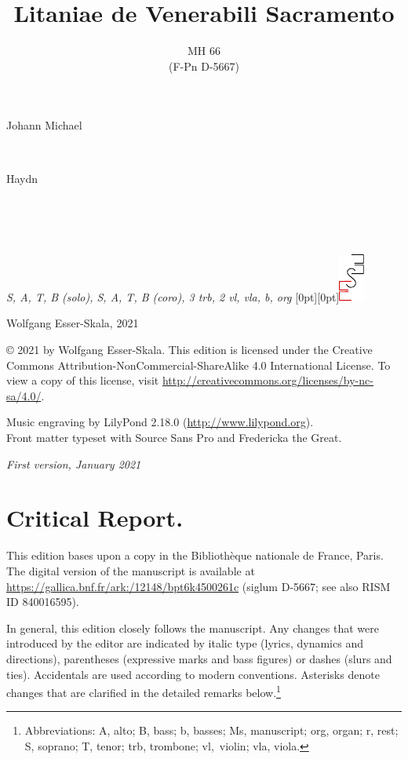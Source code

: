 \documentclass[parskip=full]{scrreprt}
\makeatletter
\DeclareRobustCommand{\sbseries}{\fontseries{sb}\selectfont}
\newcommand\fancytitlehead{
	\headingfont%
	\fontsize{80}{80}\selectfont\textcolor{black!80}{\@ifundefined{@shortname}{\@lastname}{\@shortname}.}\\[15pt]%
	\fontsize{60}{60}\selectfont\@ifundefined{@shorttitle}{\@title}{\@shorttitle}.%
}
\def\firstname#1{\def\@firstname{#1}}
\def\lastname#1{\def\@lastname{#1}}
\def\shortname#1{\def\@shortname{#1}}
\def\shorttitle#1{\def\@shorttitle{#1}}
\def\instrumentation#1{\def\@instrumentation{#1}}
\def\maketitle{%
\begin{titlepage}%
	\Large%
	{\@titlehead}%
	\vfill%
	{\strut\@firstname}\\%
	{\sbseries\color{oldred}\strut\@lastname}\\%
	{\strut\@namesuffix}%
	\vfill%
	{\sbseries\@title}\\%
	{\@subtitle}\\[\baselineskip]%
	{\itshape\@instrumentation}%
	\vfill%
	{\itshape\@parts}\hspace*{\fill}\raisebox{0pt}[0pt][0pt]{\includegraphics{ees_logo}}%
\end{titlepage}%
}
\newif\ifprintreport\printreportfalse
\makeatother
\begin{document}
\frenchspacing

\titlehead{\fancytitlehead}
\firstname{Johann Michael}
\lastname{Haydn}
\shortname{M. Haydn}
\title{Litaniae de Venerabili Sacramento}
\shorttitle{Litaniae de V. S}
\subtitle{MH 66\\(F-Pn D-5667)}
\instrumentation{S, A, T, B (solo), S, A, T, B (coro), 3 trb, 2 vl, vla, b, org}
\maketitle


\thispagestyle{empty}

\vspace*{\fill}

\hspace*{1em}Wolfgang Esser-Skala, 2021

© 2021 by Wolfgang Esser-Skala. This edition is licensed under the Creative Commons Attribution-NonCommercial-ShareAlike 4.0 International License. To view a copy of this license, visit \url{http://creativecommons.org/licenses/by-nc-sa/4.0/}. 

Music engraving by LilyPond 2.18.0 (\url{http://www.lilypond.org}).\\
Front matter typeset with Source Sans Pro and Fredericka the Great.

\textit{First version, January 2021}

\vspace*{2cm}

\ifprintreport
\chapter*{Critical Report.}

This edition bases upon a copy in the Bibliothèque nationale de France, Paris. The digital version of the manuscript is available at \url{https://gallica.bnf.fr/ark:/12148/bpt6k4500261c} (siglum D-5667; see also RISM ID 840016595).

In general, this edition closely follows the manuscript. Any changes that were introduced by the editor are indicated by italic type (lyrics, dynamics and directions), parentheses (expressive marks and bass figures) or dashes (slurs and ties). Accidentals are used according to modern conventions. Asterisks denote changes that are clarified in the detailed remarks below.\footnote{Abbreviations: A, alto; B, bass; b, basses; Ms, manuscript; org, organ; r, rest; S, soprano; T, tenor; trb, trombone; vl,~violin; vla, viola.}
\end{document}
